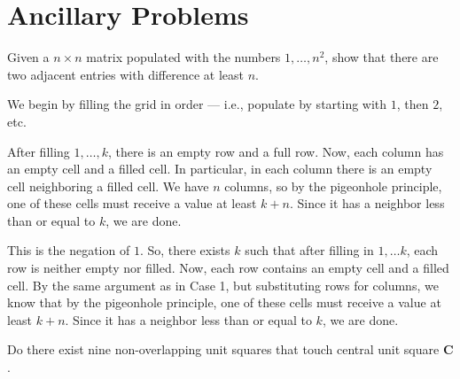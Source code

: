 \documentclass[10pt]{mypackage}
\begin{document}
\section{Ancillary Problems}%
\begin{problem}
  Given a $n\times n$ matrix populated with the numbers $1,\dots,n^2$, show that there are two adjacent entries with difference at least $n$.
\end{problem}
\begin{solution}
  We begin by filling the grid in order --- i.e., populate by starting with $1$, then $2$, etc.
  \begin{description}[font=\normalfont\scshape,leftmargin=0pt]\itemsep=10pt
    \item[Case 1:] After filling $1,\dots,k$, there is an empty row and a full row. Now, each column has an empty cell and a filled cell. In particular, in each column there is an empty cell neighboring a filled cell. We have $n$ columns, so by the pigeonhole principle, one of these cells must receive a value at least $k+n$. Since it has a neighbor less than or equal to $k$, we are done.
    \item[Case 2:] This is the negation of $1$. So, there exists $k$ such that after filling in $1,\dots k$, each row is neither empty nor filled. Now, each row contains an empty cell and a filled cell. By the same argument as in Case 1, but substituting rows for columns, we know that by the pigeonhole principle, one of these cells must receive a value at least $k+n$. Since it has a neighbor less than or equal to $k$, we are done.
  \end{description}
\end{solution}
\begin{problem}
  Do there exist nine non-overlapping unit squares that touch central unit square $\mathbf{C}$.
\end{problem}
\end{document}
